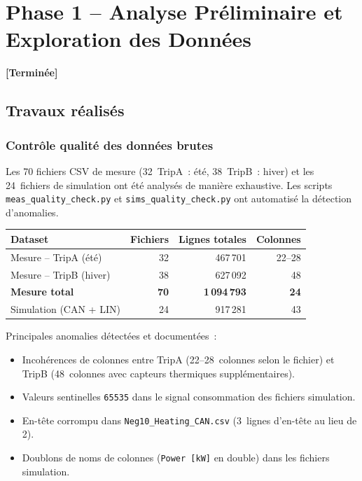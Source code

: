 \documentclass[a4paper,11pt]{article}
\begin{document}
\section{Phase 1 -- Analyse Préliminaire et Exploration des Données}
\textcolor{statusdone}{\textbf{[Terminée]}}

\subsection{Travaux réalisés}

\subsubsection{Contrôle qualité des données brutes}

Les 70 fichiers CSV de mesure (32~TripA~: été, 38~TripB~: hiver) et les
24~fichiers de simulation ont été analysés de manière exhaustive.
Les scripts \texttt{meas\_quality\_check.py} et \texttt{sims\_quality\_check.py}
ont automatisé la détection d'anomalies.

\begin{center}
\small\renewcommand{\arraystretch}{1.3}
\begin{tabular}{lrrr}
\toprule
\textbf{Dataset} & \textbf{Fichiers} & \textbf{Lignes totales} & \textbf{Colonnes} \\
\midrule
Mesure -- TripA (été) & 32 & 467\,701 & 22--28 \\
Mesure -- TripB (hiver) & 38 & 627\,092 & 48 \\
\textbf{Mesure total} & \textbf{70} & \textbf{1\,094\,793} & \textbf{24} \\
\midrule
Simulation (CAN + LIN) & 24 & 917\,281 & 43 \\
\bottomrule
\end{tabular}
\end{center}

Principales anomalies détectées et documentées~:
\begin{itemize}[nosep]
  \item Incohérences de colonnes entre TripA (22--28~colonnes selon le fichier)
    et TripB (48~colonnes avec capteurs thermiques supplémentaires).
  \item Valeurs sentinelles \texttt{65535} dans le signal consommation des fichiers simulation.
  \item En-tête corrompu dans \texttt{Neg10\_Heating\_CAN.csv} (3~lignes d'en-tête au lieu de 2).
  \item Doublons de noms de colonnes (\texttt{Power [kW]} en double) dans les fichiers simulation.
\end{itemize}
\end{document}
